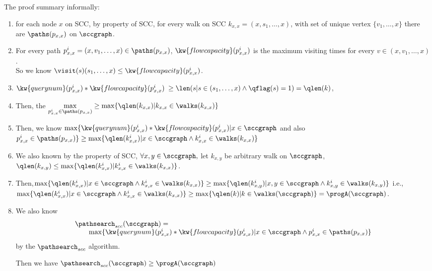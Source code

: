The proof summary informally:
\begin{enumerate}
\item for each node $x$ on SCC, by property of SCC, 
for every walk on SCC $k_{x, x} = (x, s_1, \ldots, x)$,
with set of unique vertex $\{v_1, \ldots, x\}$
there are $\paths(p_{x,x})$ on $\sccgraph$.
\item For every path $p_{x,x}^{i} = (x, v_1, \ldots, x) \in \paths(p_{x,x})$,  
$\kw{flowcapacity} (p_{x,x}^{i})$ is the maximum visiting times for every $v \in (x, v_1, \ldots, x)$. 
\\
So we know $\visit(s) (s_1, \ldots, x) \leq \kw{flowcapacity}(p_{x,x}^{i})$.
\item 
$\kw{querynum}(p_{x,x}^{i})  * \kw{flowcapacity}(p_{x,x}^{i})$  $\geq\len(s | s \in ( s_1, \ldots, x) \land \qflag(s) = 1) =  \qlen(k)$,
\item 
Then, the $\max\limits_{p_{x,x}^{i} \in \paths(p_{x,x})} \geq \max\{\qlen(k_{x, x}) | k_{x, x} \in \walks(k_{x, x})\}$
\item 
Then, we know $\max\{\kw{querynum}(p_{x,x}^{i})  * \kw{flowcapacity}(p_{x,x}^{i}) | x \in \sccgraph $
and also $ {p_{x,x}^{i} \in \paths(p_{x,x})} \} 
\geq \max\{\qlen(k_{x, x}^i) |x \in \sccgraph \land  k_{x, x}^i \in \walks(k_{x, x})\}$
\item 
We also known by the property of SCC, $\forall x, y \in \sccgraph, $ let $k_{x, y}$ be arbitrary walk on $\sccgraph$,
 $\qlen(k_{x, y}) \leq \max\{\qlen(k_{x, x}^i) | k_{x, x}^i \in \walks(k_{x, x})\}$.
 \item 
Then,$ \max\{\qlen(k_{x, x}^i) |x \in \sccgraph \land  k_{x, x}^i \in \walks(k_{x, x})\} \geq  \max\{\qlen(k_{x, y}^i) |x, y \in \sccgraph \land  k_{x, y}^i \in \walks(k_{x, y})\}$
i.e., 
$ \max\{\qlen(k_{x, x}^i) |x \in \sccgraph \land  k_{x, x}^i \in \walks(k_{x, x})\} \geq  \max\{\qlen(k) | k\in \walks(\sccgraph)\} = \progA(\sccgraph)$.
\item 
We also know 
$$
\begin{array}{l}
  \pathsearch_{scc}(\sccgraph) = \\
  \qquad \max\{\kw{querynum}(p_{x,x}^{i})  * \kw{flowcapacity}(p_{x,x}^{i}) 
 | x \in \sccgraph \land {p_{x,x}^{i} \in \paths(p_{x,x})} \} 
\end{array}
$$ 
by the $\pathsearch_{scc}$ algorithm.

Then we have
$\pathsearch_{scc}(\sccgraph) \geq \progA(\sccgraph)$
\end{enumerate}

